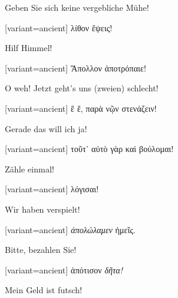 Geben Sie sich keine vergebliche Mühe!

\switchcolumn

\begin{greek}[variant=ancient]%
λίθον ἕψεις!

\end{greek}%
\switchcolumn*

Hilf Himmel!

\switchcolumn

\begin{greek}[variant=ancient]%
Ἄπολλον ἀποτρόπαιε!

\end{greek}%
\switchcolumn*

O weh! Jetzt geht's uns (zweien) schlecht!

\switchcolumn

\begin{greek}[variant=ancient]%
ἒ ἔ, παρὰ νῷν στενάζειν!

\end{greek}%
\switchcolumn*

Gerade das will ich ja!

\switchcolumn

\begin{greek}[variant=ancient]%
τοῦτ᾽ αὐτὸ γὰρ καὶ βούλομαι!

\end{greek}%
\switchcolumn*

Zähle einmal!

\switchcolumn

\begin{greek}[variant=ancient]%
λόγισαι!

\end{greek}%
\switchcolumn*

Wir haben verspielt!

\switchcolumn

\begin{greek}[variant=ancient]%
\emph{ἀπολώλαμεν} ἡμεῖς.

\end{greek}%
\switchcolumn*

Bitte, bezahlen Sie!

\switchcolumn

\begin{greek}[variant=ancient]%
ἀπότισον \emph{δῆτα!}

\end{greek}%
\switchcolumn*

Mein Geld ist futsch!

